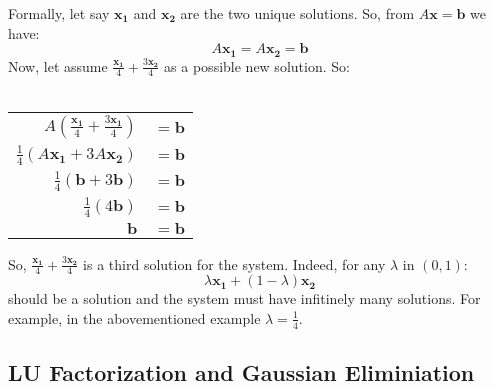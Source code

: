 \documentclass{article}
\renewcommand{\vec}[1]{\mathbf{#1}}
\begin{document}
\begin{enumerate}
Formally, let say $\vec{x_1}$ and $\vec{x_2}$ are the two unique solutions.  So, from $A\vec{x}=\vec{b}$ we have:
$$A\vec{x_1}=A\vec{x_2}=\vec{b}$$
Now, let assume $\frac{\vec{x_1}}{4}+\frac{3\vec{x_2}}{4}$ as a possible new solution.  So:\\
\\
\begin{tabular}{rl}
$A(\frac{\vec{x_1}}{4}+\frac{3\vec{x_1}}{4})$ & $= \vec{b}$ \\
$\frac{1}{4}(A\vec{x_1}+3A\vec{x_2})$ & $= \vec{b}$ \\
$\frac{1}{4}(\vec{b}+3\vec{b})$ & $= \vec{b}$ \\
$\frac{1}{4}(4\vec{b})$ & $= \vec{b}$ \\
$\vec{b}$ & $= \vec{b}$ \\
\end{tabular}

So, $\frac{\vec{x_1}}{4}+\frac{3\vec{x_2}}{4}$ is a third solution for the system.  Indeed, for any $\lambda$ in $(0,1)$:
$$\lambda\vec{x_1}+(1-\lambda)\vec{x_2}$$
should be a solution and the system must have infitinely many solutions.  For example, in the abovementioned example $\lambda=\frac{1}{4}$. 

\end{enumerate}

\subsection*{LU Factorization and Gaussian Eliminiation}
\end{document}
